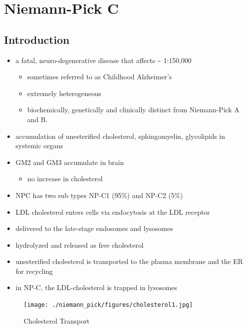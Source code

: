 \documentclass{scrartcl}
\begin{document}
\section{Niemann-Pick C}
\label{sec:org24e0afc}
\subsection{Introduction}
\label{sec:org388f93e}
\begin{itemize}
\item a fatal, neuro-degenerative disease that affects \textasciitilde{} 1:150,000
\begin{itemize}
\item sometimes referred to as Childhood Alzheimer’s
\item extremely heterogeneous
\item biochemically, genetically and clinically distinct from Niemann-Pick A and B.
\end{itemize}
\item accumulation of unesterified cholesterol, sphingomyelin, glycolipids in systemic organs
\item GM2 and GM3 accumulate in brain
\begin{itemize}
\item no increase in cholesterol
\end{itemize}
\item NPC has two sub types NP-C1 (95\%) and NP-C2 (5\%)

\item LDL cholesterol enters cells via endocytosis at the LDL receptor
\item delivered to the late-stage endosomes and lysosomes
\item hydrolyzed and released as free cholesterol
\item unesterified cholesterol is transported to the plasma membrane and the ER for recycling

\item in NP-C, the LDL-cholesterol is trapped in lysosomes
\end{itemize}

\begin{figure}[htbp]
\centering
\texttt{[image: ./niemann\_pick/figures/cholesterol1.jpg]}
\caption{\label{fig:orgc4c2192}
Cholesterol Transport}
\end{figure}
\end{document}
